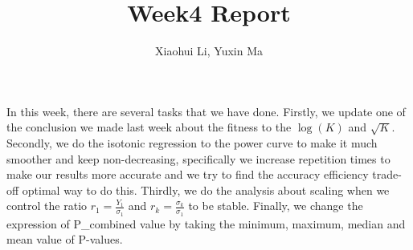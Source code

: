 \documentclass[10pt,english]{article}\usepackage{graphicx, color}
\numberwithin{equation}{section}
\numberwithin{figure}{section}
\begin{document}
\title{Week4 Report}


\author{Xiaohui Li, Yuxin Ma}

\maketitle


In this week, there are several tasks that we have done. Firstly, we update one of the conclusion we made last week about the fitness to the $\log(K)$ and $\sqrt{K}$. Secondly, we do the isotonic regression to the power curve to make it much smoother and keep non-decreasing, specifically we increase repetition times to make our results more accurate and we try to find the accuracy efficiency trade-off optimal way to do this.  Thirdly, we do the analysis about scaling when we control the ratio $r_1=\frac{Y_1}{\sigma_1}$ and $r_k=\frac{\sigma_k}{\sigma_1}$ to be stable. Finally, we change the expression of P\_combined value by taking the minimum, maximum, median and mean value of P-values.
\end{document}
